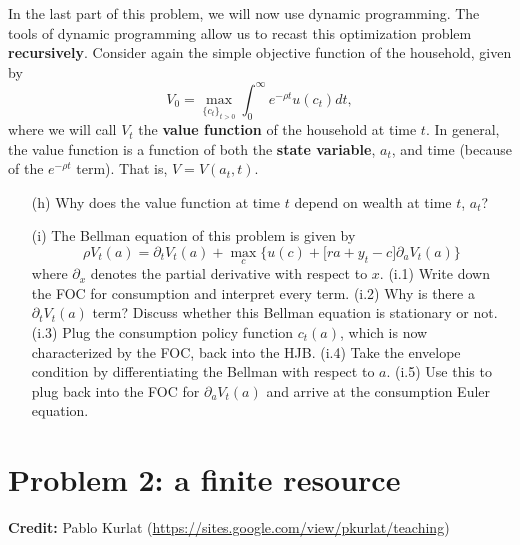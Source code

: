 \documentclass[11pt]{extarticle}
\theoremstyle{plain}
\theoremstyle{definition}
\begin{document}
\vspace{10mm}
\noindent
In the last part of this problem, we will now use dynamic programming. The tools of dynamic programming allow us to recast this optimization problem \textbf{recursively}. Consider again the simple objective function of the household, given by
\begin{equation*}
	V_0 = \max_{\{c_t\}_{t>0}} \int_0^\infty e^{-\rho t} u(c_t) dt,
\end{equation*}
where we will call $V_t$ the \textbf{value function} of the household at time $t$. In general, the value function is a function of both the \textbf{state variable}, $a_t$, and time (because of the $e^{-\rho t}$ term). That is, $V = V(a_t, t)$. 

\begin{enumerate}
	\item [(h)] Why does the value function at time $t$ depend on wealth at time $t$, $a_t$? 
\end{enumerate}


\begin{enumerate}
	\item [(i)] The Bellman equation of this problem is given by
	\begin{equation*}
		\rho V_t(a) = \partial_t V_t(a)+ \max_c \bigg\{ u(c) + \Big[ ra + y_t - c \Big] \partial_a V_t(a) \bigg\}
	\end{equation*}
	where $\partial_x$ denotes the partial derivative with respect to $x$. (i.1) Write down the FOC for consumption and interpret every term. (i.2) Why is there a $\partial_t V_t(a)$ term? Discuss whether this Bellman equation is stationary or not. (i.3) Plug the consumption policy function $c_t(a)$, which is now characterized by the FOC, back into the HJB. (i.4) Take the envelope condition by differentiating the Bellman with respect to $a$. (i.5) Use this to plug back into the FOC for $\partial_a V_t(a)$ and arrive at the consumption Euler equation.
\end{enumerate}





\vspace{10mm}
\section*{Problem 2: a finite resource}

\textbf{Credit:} Pablo Kurlat (\url{https://sites.google.com/view/pkurlat/teaching})
\end{document}
